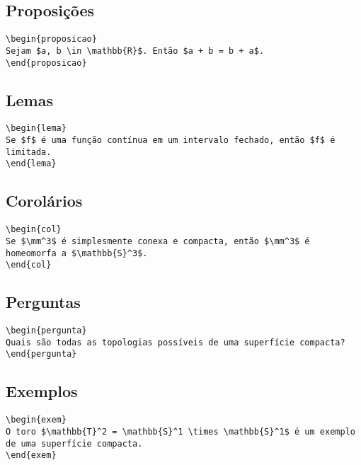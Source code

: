 \documentclass[a4paper,12pt]{article}
\begin{document}
\subsection*{Proposições}
\begin{verbatim}
\begin{proposicao}
Sejam $a, b \in \mathbb{R}$. Então $a + b = b + a$.
\end{proposicao}
\end{verbatim}

\subsection*{Lemas}
\begin{verbatim}
\begin{lema}
Se $f$ é uma função contínua em um intervalo fechado, então $f$ é limitada.
\end{lema}
\end{verbatim}

\subsection*{Corolários}
\begin{verbatim}
\begin{col}
Se $\mm^3$ é simplesmente conexa e compacta, então $\mm^3$ é homeomorfa a $\mathbb{S}^3$.
\end{col}
\end{verbatim}

\subsection*{Perguntas}
\begin{verbatim}
\begin{pergunta}
Quais são todas as topologias possíveis de uma superfície compacta?
\end{pergunta}
\end{verbatim}

\subsection*{Exemplos}
\begin{verbatim}
\begin{exem}
O toro $\mathbb{T}^2 = \mathbb{S}^1 \times \mathbb{S}^1$ é um exemplo de uma superfície compacta.
\end{exem}
\end{verbatim}
\end{document}
